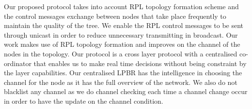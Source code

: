 Our proposed protocol takes into account RPL topology formation scheme and the control messages exchange between nodes that take place frequently to maintain the quality of the tree. We enable the RPL control messages to be sent through unicast in order to reduce unnecessary transmitting in broadcast. Our work makes use of RPL topology formation and improves on the channel of the nodes in the topology. Our protocol is a cross layer protocol with a centralised co-ordinator that enables us to make real time decisions without being constraint by the layer capabilities. Our centralised LPBR has the intelligence in choosing the channel for the node as it has the full overview of the network. We also do not blacklist any channel as we do channel checking each time a channel change occur in order to have the update on the channel condition.


